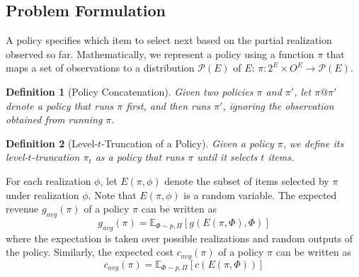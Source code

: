 \documentclass[twoside,leqno,twocolumn]{article}
\newtheorem{definition}{Definition}
\begin{document}


\subsection{Problem Formulation} %
A policy  specifies  which item to select next based on  the partial realization observed  so far. Mathematically, we represent a policy using a function $\pi$ that maps a set of observations  to a distribution $\mathcal{P}(E)$ of $E$: $\pi: 2^{E}\times O^E \rightarrow \mathcal{P}(E)$.

\begin{definition}[Policy  Concatenation]
Given two policies $\pi$ and $\pi'$,  let $\pi @\pi'$ denote a policy that runs $\pi$ first, and then runs $\pi'$, ignoring the observation obtained from running $\pi$.
\end{definition}


\begin{definition}[Level-$t$-Truncation of a Policy]
Given a policy $\pi$, we define its  level-$t$-truncation $\pi_t$  as a policy that runs $\pi$ until it selects $t$ items.
\end{definition}

 For each  realization $\phi$, let $E(\pi, \phi)$ denote the subset of items selected by $\pi$ under realization $\phi$. Note that $E(\pi, \phi)$ is a random variable. The expected  revenue $g_{avg}(\pi)$ of a policy $\pi$ can be written as
\[g_{avg}(\pi)=\mathbb{E}_{\Phi\sim p, \Pi}[g(E(\pi, \Phi), \Phi)]\]
 where the expectation is taken over possible realizations and random outputs of the policy.  Similarly,  the expected  cost $c_{avg}(\pi)$ of a policy $\pi$ can be written as
\[c_{avg}(\pi)=\mathbb{E}_{\Phi\sim p, \Pi}[c(E(\pi, \Phi))]\]
\end{document}
